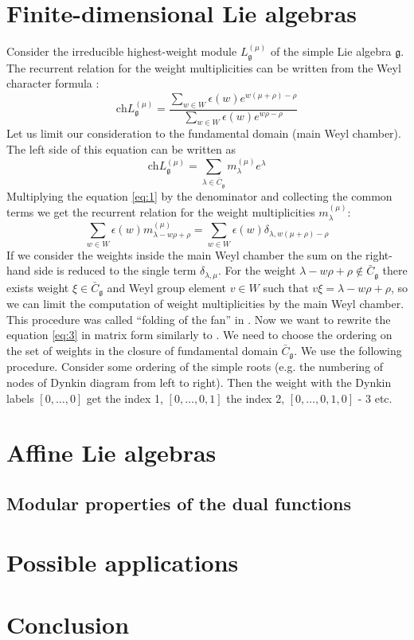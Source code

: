 \documentclass[a4paper,12pt]{article}
\theoremstyle{definition} \newtheorem{Def}{Definition}
\begin{document}
\section{Finite-dimensional Lie algebras}
\label{sec:finite-dimens-lie}
Consider the irreducible highest-weight module $L^{(\mu)}_{\mathfrak{g}}$ of the simple Lie algebra $\mathfrak{g}$. 
The recurrent relation for the weight multiplicities can be written from the Weyl character formula \cite{lyakhovsky1996rra}:
\begin{equation}
  \label{eq:1}
  \mathrm{ch} L^{(\mu)}_{\mathfrak{g}}=\frac{\sum_{w\in W}\epsilon(w) e^{w(\mu+\rho)-\rho}}{\sum_{w\in W}\epsilon(w) e^{w \rho -\rho}}
\end{equation}
Let us limit our consideration to the fundamental domain (main Weyl chamber). The left side of this equation can be written as
\begin{equation}
  \label{eq:2}
   \mathrm{ch} L^{(\mu)}_{\mathfrak{g}}=\sum_{\lambda\in \bar{C}_{\mathfrak{g}}} m^{(\mu)}_{\lambda} e^{\lambda}
\end{equation}
Multiplying the equation \eqref{eq:1} by the denominator  and collecting the common terms we get the recurrent relation for the weight multiplicities $m^{(\mu)}_{\lambda}$:
\begin{equation}
  \label{eq:3}
  \sum_{w\in W} \epsilon(w) m^{(\mu)}_{\lambda-w\rho+\rho}=\sum_{w\in W}\epsilon(w) \delta_{\lambda,w(\mu+\rho)-\rho}
\end{equation}
If we consider the weights inside the main Weyl chamber the sum on the right-hand side is reduced to the single term $\delta_{\lambda,\mu}$. For the weight $\lambda-w\rho+\rho\not\in \bar{C}_{\mathfrak{g}}$ there exists weight $\xi\in \bar{C}_{\mathfrak{g}}$ and Weyl group element $v\in W$ such that $v\xi=\lambda-w\rho+\rho$, so we can limit the computation of weight multiplicities by the main Weyl chamber. This procedure was called ``folding of the fan'' in \cite{il2010folded}.
Now we want to rewrite the equation \eqref{eq:3} in matrix form similarly to \cite{2010arXiv1001.3683N}.
We need to choose the ordering on the set of weights in the closure of fundamental domain $\bar{C}_{\mathfrak{g}}$. We use the following procedure. Consider some ordering of the simple roots (e.g. the numbering of nodes of Dynkin diagram from left to right). Then the weight with the Dynkin labels $[0,\dots,0]$ get the index 1, $[0,\dots,0,1]$ the index 2, $[0,\dots,0,1,0]$ - 3 etc.
\section{Affine Lie algebras}
\label{sec:affine-lie-algebras}

\subsection{Modular properties of the dual functions}
\label{sec:modul-prop-dual}

\section{Possible applications}
\label{sec:poss-appl}

\section{Conclusion}
\label{sec:conclusion}



{}

\end{document}
